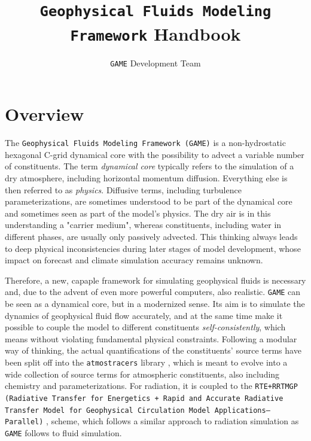 \documentclass[10pt]{report}
\title{\texttt{Geophysical Fluids Modeling Framework} Handbook}
\author{\texttt{GAME} Development Team}
\date{}
\begin{document}
\maketitle

\tableofcontents

\chapter{Overview}
\label{chap:overview}

The \texttt{Geophysical Fluids Modeling Framework (GAME)} is a non-hydrostatic hexagonal C-grid dynamical core with the possibility to advect a variable number of constituents. The term \textit{dynamical core} typically refers to the simulation of a dry atmosphere, including horizontal momentum diffusion. Everything else is then referred to as \textit{physics}. Diffusive terms, including turbulence parameterizations, are sometimes understood to be part of the dynamical core and sometimes seen as part of the model's physics. The dry air is in this understanding a "carrier medium", whereas constituents, including water in different phases, are usually only passively advected. This thinking always leads to deep physical inconsistencies during later stages of model development, whose impact on forecast and climate simulation accuracy remains unknown.

Therefore, a new, capaple framework for simulating geophysical fluids is necessary and, due to the advent of even more powerful computers, also realistic. \texttt{GAME} can be seen as a dynamical core, but in a modernized sense. Its aim is to simulate the dynamics of geophysical fluid flow accurately, and at the same time make it possible to couple the model to different constituents \textit{self-consistently}, which means without violating fundamental physical constraints. Following a modular way of thinking, the actual quantifications of the constituents' source terms have been split off into the \texttt{atmostracers} library \cite{atmostracers-github}, which is meant to evolve into a wide collection of source terms for atmospheric constituents, also including chemistry and parameterizations. For radiation, it is coupled to the \texttt{RTE+RRTMGP (Radiative Transfer for Energetics + Rapid and Accurate Radiative Transfer Model for Geophysical Circulation Model Applications—Parallel)} \cite{doi:10.1029/2019MS001621}, \cite{rte-rrtmgp-github} scheme, which follows a similar approach to radiation simulation as \texttt{GAME} follows to fluid simulation.
\end{document}
